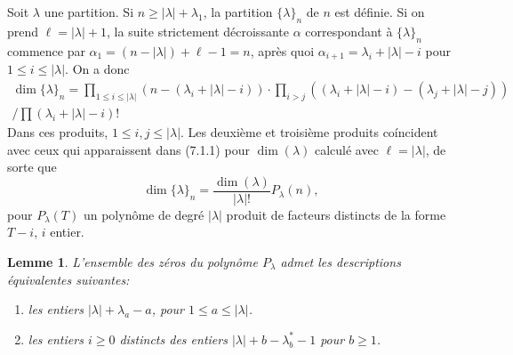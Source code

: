 \documentclass[11pt,a4paper]{article}
\theoremstyle{plain}
\newtheorem{lemma}[theorem]{Lemme}
\theoremstyle{definition}
\begin{document}
\subsection{}
Soit $\lambda$ une partition. Si $n \geq |\lambda| + \lambda_1$, la partition $\{\lambda\}_n$ de $n$ est d\'efinie. Si on prend $\ell = |\lambda| + 1$, la suite strictement d\'ecroissante $\alpha$ correspondant \`a $\{\lambda\}_n$ commence par $\alpha_1 = (n - |\lambda|) + \ell - 1 = n$, apr\`es quoi $\alpha_{i+1} = \lambda_i + |\lambda| - i$ pour $1 \leq i \leq |\lambda|$. On a donc
\begin{multline}
\dim \{\lambda\}_n = \prod_{1 \leq i \leq |\lambda|} (n - (\lambda_i + |\lambda| - i)) \cdot \prod_{i > j} ((\lambda_i + |\lambda| - i) - (\lambda_j + |\lambda| - j)) \\
/ \prod (\lambda_i + |\lambda| - i)! \tag{7.2.1}
\end{multline}
Dans ces produits, $1 \leq i, j \leq |\lambda|$. Les deuxi\`eme et troisi\`eme produits co\'incident avec ceux qui apparaissent dans (7.1.1) pour $\dim(\lambda)$ calcul\'e avec $\ell = |\lambda|$, de sorte que
\begin{equation}
\dim \{\lambda\}_n = \frac{\dim(\lambda)}{|\lambda|!} P_\lambda(n), \tag{7.2.2}
\end{equation}
pour $P_\lambda(T)$ un polyn\^ome de degr\'e $|\lambda|$ produit de facteurs distincts de la forme $T - i$, $i$ entier.

\begin{lemma}
L'ensemble des z\'eros du polyn\^ome $P_\lambda$ admet les descriptions \'equivalentes suivantes:
\begin{enumerate}[label=(\roman*)]
\item les entiers $|\lambda| + \lambda_a - a$, pour $1 \leq a \leq |\lambda|$.
\item les entiers $i \geq 0$ distincts des entiers $|\lambda| + b - \lambda^*_b - 1$ pour $b \geq 1$.
\end{enumerate}
\end{lemma}
\end{document}
